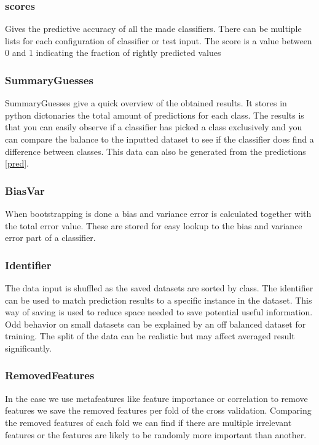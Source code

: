 \documentclass[a4paper,10pt]{article}
\begin{document}
\subsubsection{scores}
Gives the predictive accuracy of all the made classifiers. There can be multiple lists for each configuration of classifier or test input. The score is a value between 0 and 1 indicating the fraction of rightly predicted values

\subsubsection{SummaryGuesses}
SummaryGuesses give a quick overview of the obtained results. It stores in python dictonaries the total amount of predictions for each class. The results is that you can easily observe if a classifier has picked a class exclusively and you can compare the balance to the inputted dataset to see if the classifier does find a difference between classes. This data can also be generated from the predictions \ref{pred}.

\subsubsection{BiasVar}
When bootstrapping is done a bias and variance error is calculated together with the total error value. These are stored for easy lookup to the bias and variance error part of a classifier.

\subsubsection{Identifier}
The data input is shuffled as the saved datasets are sorted by class. The identifier can be used to match prediction results to a specific instance in the dataset. This way of saving is used to reduce space needed to save potential useful information. Odd behavior on small datasets can be explained by an off balanced dataset for training. The split of the data can be realistic but may affect averaged result significantly. 

\subsubsection{RemovedFeatures}
In the case we use metafeatures like feature importance or correlation to remove features we save the removed features per fold of the cross validation. Comparing the removed features of each fold we can find if there are multiple irrelevant features or the features are likely to be randomly more important than another.
\end{document}
